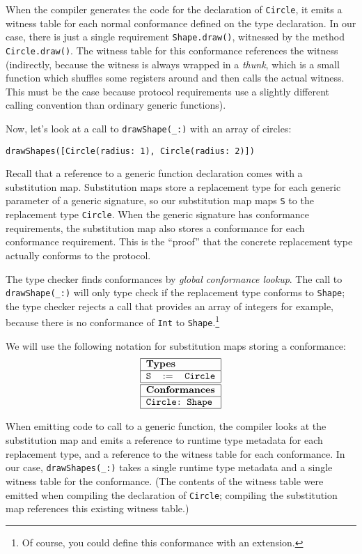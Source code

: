 \documentclass[a4paper,headsepline,bibliography=totoc,toc=flat,fleqn,twoside=semi]{scrbook}
\theoremstyle{definition}
\theoremstyle{definition}
\theoremstyle{definition}
\newcommand{\SubMapC}[2]{\begin{tabular}{|lll|}
\hline
\multicolumn{3}{|l|}{\textbf{Types}}\\
\hline
#1\\
\hline
\hline
\multicolumn{3}{|l|}{\textbf{Conformances}}\\
\hline
#2\\
\hline
\end{tabular}}
\newcommand{\SubType}[2]{\texttt{#1}&$:=$&\texttt{#2}}
\newcommand{\SubConf}[1]{\multicolumn{3}{|l|}{\texttt{#1}}}
\begin{document}
When the compiler generates the code for the declaration of \texttt{Circle}, it emits a witness table for each normal conformance defined on the type declaration. In our case, there is just a single requirement \texttt{Shape.draw()}, witnessed by the method \texttt{Circle.draw()}. The witness table for this conformance references the witness (indirectly, because the witness is always wrapped in a \emph{thunk}, which is a small function which shuffles some registers around and then calls the actual witness. This must be the case because protocol requirements use a slightly different calling convention than ordinary generic functions).

Now, let's look at a call to \verb|drawShape(_:)| with an array of circles:
\begin{Verbatim}
drawShapes([Circle(radius: 1), Circle(radius: 2)])
\end{Verbatim}
Recall that a reference to a generic function declaration comes with a substitution map. Substitution maps store a replacement type for each generic parameter of a generic signature, so our substitution map maps \texttt{S} to the replacement type \texttt{Circle}. When the generic signature has conformance requirements, the substitution map also stores a conformance for each conformance requirement. This is the ``proof'' that the concrete replacement type actually conforms to the protocol.

The type checker finds conformances by \emph{global conformance lookup}. The call to \verb|drawShape(_:)| will only type check if the replacement type conforms to \texttt{Shape}; the type checker rejects a call that provides an array of integers for example, because there is no conformance of \texttt{Int} to \texttt{Shape}.\footnote{Of course, you could define this conformance with an extension.}

We will use the following notation for substitution maps storing a conformance:
\[\SubMapC{\SubType{S}{Circle}}{\SubConf{Circle:\ Shape}}\]

When emitting code to call to a generic function, the compiler looks at the substitution map and emits a reference to runtime type metadata for each replacement type, and a reference to the witness table for each conformance. In our case, \verb|drawShapes(_:)| takes a single runtime type metadata and a single witness table for the conformance. (The contents of the witness table were emitted when compiling the declaration of \texttt{Circle}; compiling the substitution map references this existing witness table.)
\end{document}
